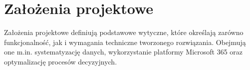 \section{Założenia projektowe}
Założenia projektowe definiują podstawowe wytyczne, które określają zarówno funkcjonalność, jak i wymagania techniczne tworzonego rozwiązania. Obejmują one m.in. systematyzację danych, wykorzystanie platformy Microsoft 365 oraz optymalizację procesów decyzyjnych.



